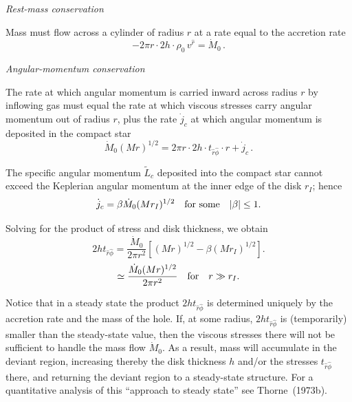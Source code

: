 \textit{Rest-mass conservation}

Mass must flow across a cylinder of radius $r$ at a rate equal to the accretion rate
\begin{equation}
-2\pi r \cdot 2h \cdot \rho_0\, v^{\hat{r}} = \dot{M}_0\,.
\tag{5.2.15}
\end{equation}


\textit{Angular-momentum conservation}

The rate at which angular momentum is carried inward across radius $r$ by
inflowing gas must equal the rate at which viscous stresses carry angular
momentum out of radius $r$, plus the rate $\dot{j}_c$ at which angular momentum is
deposited in the compact star
\begin{equation}
\dot{M}_0 (Mr)^{1/2} = 2\pi r \cdot 2h \cdot t_{\hat{r}\hat{\phi}} \cdot r + \dot{j}_c\,.
\tag{5.2.17}
\end{equation}

The specific angular momentum $\tilde{L}_c$ deposited into the compact star cannot
exceed the Keplerian angular momentum at the inner edge of the disk $r_I$;
hence
\begin{equation}
\dot{j}_c = \beta \dot{M}_0 (Mr_I)^{1/2} \quad \text{for some} \quad |\beta| \leq 1.
\notag
\end{equation}

Solving for the product of stress and disk thickness, we obtain
\begin{equation}
2h t_{\hat{r}\hat{\phi}} = \frac{\dot{M}_0}{2\pi r^2}\left[(Mr)^{1/2}
- \beta(Mr_I)^{1/2}\right].
\tag{5.2.18}
\end{equation}
\begin{equation}
\simeq \frac{\dot{M}_0(Mr)^{1/2}}{2\pi r^2}
\quad \text{for} \quad r \gg r_I.
\notag
\end{equation}

Notice that in a steady state the product $2h t_{\hat{r}\hat{\phi}}$ is determined uniquely by the
accretion rate and the mass of the hole. If, at some radius, $2h t_{\hat{r}\hat{\phi}}$ is (temporarily)
smaller than the steady-state value, then the viscous stresses there will not be sufficient to
handle the mass flow $\dot{M}_0$. As a result, mass will accumulate in the deviant region,
increasing thereby the disk thickness $h$ and/or the stresses $t_{\hat{r}\hat{\phi}}$ there, and returning
the deviant region to a steady-state structure. For a quantitative analysis of this
``approach to steady state'' see Thorne~(1973b)\cite{Thorne1973b}.

